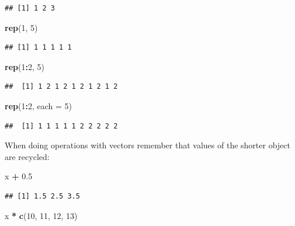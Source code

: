 \documentclass[12pt,]{book}
\newenvironment{Shaded}{\begin{snugshade}}{\end{snugshade}}
\newcommand{\DataTypeTok}[1]{\textcolor[rgb]{0.13,0.29,0.53}{#1}}
\newcommand{\DecValTok}[1]{\textcolor[rgb]{0.00,0.00,0.81}{#1}}
\newcommand{\FloatTok}[1]{\textcolor[rgb]{0.00,0.00,0.81}{#1}}
\newcommand{\KeywordTok}[1]{\textcolor[rgb]{0.13,0.29,0.53}{\textbf{#1}}}
\newcommand{\NormalTok}[1]{#1}
\newcommand{\OperatorTok}[1]{\textcolor[rgb]{0.81,0.36,0.00}{\textbf{#1}}}
\newcommand{\StringTok}[1]{\textcolor[rgb]{0.31,0.60,0.02}{#1}}
\begin{document}
\begin{verbatim}
## [1] 1 2 3
\end{verbatim}

\begin{Shaded}
\begin{Highlighting}[]
\KeywordTok{rep}\NormalTok{(}\DecValTok{1}\NormalTok{, }\DecValTok{5}\NormalTok{)}
\end{Highlighting}
\end{Shaded}

\begin{verbatim}
## [1] 1 1 1 1 1
\end{verbatim}

\begin{Shaded}
\begin{Highlighting}[]
\KeywordTok{rep}\NormalTok{(}\DecValTok{1}\OperatorTok{:}\DecValTok{2}\NormalTok{, }\DecValTok{5}\NormalTok{)}
\end{Highlighting}
\end{Shaded}

\begin{verbatim}
##  [1] 1 2 1 2 1 2 1 2 1 2
\end{verbatim}

\begin{Shaded}
\begin{Highlighting}[]
\KeywordTok{rep}\NormalTok{(}\DecValTok{1}\OperatorTok{:}\DecValTok{2}\NormalTok{, }\DataTypeTok{each =} \DecValTok{5}\NormalTok{)}
\end{Highlighting}
\end{Shaded}

\begin{verbatim}
##  [1] 1 1 1 1 1 2 2 2 2 2
\end{verbatim}

When doing operations with vectors remember that values of
the shorter object are recycled:

\begin{Shaded}
\begin{Highlighting}[]
\NormalTok{x }\OperatorTok{+}\StringTok{ }\FloatTok{0.5}
\end{Highlighting}
\end{Shaded}

\begin{verbatim}
## [1] 1.5 2.5 3.5
\end{verbatim}

\begin{Shaded}
\begin{Highlighting}[]
\NormalTok{x }\OperatorTok{*}\StringTok{ }\KeywordTok{c}\NormalTok{(}\DecValTok{10}\NormalTok{, }\DecValTok{11}\NormalTok{, }\DecValTok{12}\NormalTok{, }\DecValTok{13}\NormalTok{)}
\end{Highlighting}
\end{Shaded}
\end{document}
